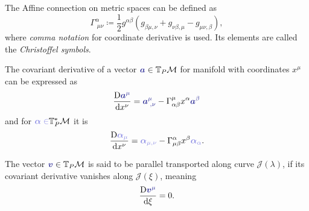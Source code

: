 \begin{definition}
The Affine connection on metric spaces can be defined as
    \begin{equation}
        \Gamma^{\alpha}_{\;\mu\nu} \coloneqq \frac{1}{2}g^{\alpha \beta}\left(g_{\beta\mu,\nu}+g_{\nu\beta,\mu}-g_{\mu\nu,\beta}\right),
    \end{equation}
    where \emph{comma notation} for coordinate derivative is used. Its elements are called the \emph{Christoffel symbols}.
\end{definition}
    The covariant derivative of a vector $\bluee{\bm a}\in \T_P\M$ for manifold with coordinates $x^\mu$ can be expressed as
    \begin{equation}
        \Der{\bluee{\bm a^\mu}}{x^\nu}=\bluee{\bm a_{\;,\nu}^\mu}-\Gamma^\mu_{\alpha\beta} x^\alpha \bluee{\bm a^\beta}
    \end{equation}
    and for $\blueee{\bm\alpha\in} \T_P^*\M$ it is
\begin{equation}
    \Der{\blueee{\bm \alpha_\mu}}{x^\nu}=\blueee{\bm \alpha_{\mu,\nu}}-\Gamma^\alpha_{\mu\beta}x^\beta \blueee{\bm \alpha_\alpha}.
\end{equation}

The vector $\bluee{\bm v}\in \T_P\M$ is said to be parallel transported along curve $\mathcal J(\lambda)$, if its covariant derivative vanishes along $\mathcal J(\xi)$, meaning
\begin{equation}
    \Der{\bluee{\bm v^\mu}}{\xi}=0.
\end{equation}

